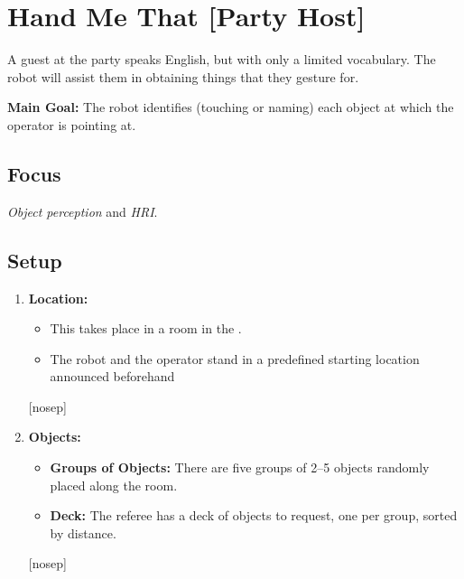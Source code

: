 \section{Hand Me That [Party Host]}
\label{test:hand-me-that}
A guest at the party speaks English, but with only a limited vocabulary. The robot will assist them in obtaining things that they gesture for.



\noindent \textbf{Main Goal:} The robot identifies (touching or naming) each object at which the operator is pointing at.

\subsection*{Focus}
\emph{Object perception} and \emph{HRI}.


%
%
\subsection*{Setup}
\begin{enumerate}[nosep]
	\item \textbf{Location:} 
	\begin{itemize}[nosep]
		\item This takes place in a room in the \Arena{}.
		\item The robot and the operator stand in a predefined starting location announced beforehand %
	\end{itemize}[nosep]
	
	\item \textbf{Objects:} 
		\begin{itemize}[nosep] 
		\item \textbf{Groups of Objects: }There are five groups of 2--5 objects randomly placed along the room.
		\item \textbf{Deck:} The referee has a deck of objects to request, one per group, sorted by distance.
		\end{itemize}[nosep]

\end{enumerate}


